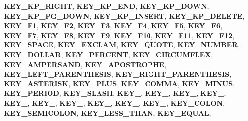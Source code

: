 \begin{DoxyCompactItemize}
{\bfseries K\+E\+Y\+\_\+\+K\+P\+\_\+\+R\+I\+G\+HT}, 
\newline
{\bfseries K\+E\+Y\+\_\+\+K\+P\+\_\+\+E\+ND}, 
{\bfseries K\+E\+Y\+\_\+\+K\+P\+\_\+\+D\+O\+WN}, 
{\bfseries K\+E\+Y\+\_\+\+K\+P\+\_\+\+P\+G\+\_\+\+D\+O\+WN}, 
{\bfseries K\+E\+Y\+\_\+\+K\+P\+\_\+\+I\+N\+S\+E\+RT}, 
\newline
{\bfseries K\+E\+Y\+\_\+\+K\+P\+\_\+\+D\+E\+L\+E\+TE}, 
{\bfseries K\+E\+Y\+\_\+\+F1}, 
{\bfseries K\+E\+Y\+\_\+\+F2}, 
{\bfseries K\+E\+Y\+\_\+\+F3}, 
\newline
{\bfseries K\+E\+Y\+\_\+\+F4}, 
{\bfseries K\+E\+Y\+\_\+\+F5}, 
{\bfseries K\+E\+Y\+\_\+\+F6}, 
{\bfseries K\+E\+Y\+\_\+\+F7}, 
\newline
{\bfseries K\+E\+Y\+\_\+\+F8}, 
{\bfseries K\+E\+Y\+\_\+\+F9}, 
{\bfseries K\+E\+Y\+\_\+\+F10}, 
{\bfseries K\+E\+Y\+\_\+\+F11}, 
\newline
{\bfseries K\+E\+Y\+\_\+\+F12}, 
{\bfseries K\+E\+Y\+\_\+\+S\+P\+A\+CE}, 
{\bfseries K\+E\+Y\+\_\+\+E\+X\+C\+L\+AM}, 
{\bfseries K\+E\+Y\+\_\+\+Q\+U\+O\+TE}, 
\newline
{\bfseries K\+E\+Y\+\_\+\+N\+U\+M\+B\+ER}, 
{\bfseries K\+E\+Y\+\_\+\+D\+O\+L\+L\+AR}, 
{\bfseries K\+E\+Y\+\_\+\+P\+E\+R\+C\+E\+NT}, 
{\bfseries K\+E\+Y\+\_\+\+C\+I\+R\+C\+U\+M\+F\+L\+EX}, 
\newline
{\bfseries K\+E\+Y\+\_\+\+A\+M\+P\+E\+R\+S\+A\+ND}, 
{\bfseries K\+E\+Y\+\_\+\+A\+P\+O\+S\+T\+R\+O\+P\+HE}, 
{\bfseries K\+E\+Y\+\_\+\+L\+E\+F\+T\+\_\+\+P\+A\+R\+E\+N\+T\+H\+E\+S\+IS}, 
{\bfseries K\+E\+Y\+\_\+\+R\+I\+G\+H\+T\+\_\+\+P\+A\+R\+E\+N\+T\+H\+E\+S\+IS}, 
\newline
{\bfseries K\+E\+Y\+\_\+\+A\+S\+T\+E\+R\+I\+SK}, 
{\bfseries K\+E\+Y\+\_\+\+P\+L\+US}, 
{\bfseries K\+E\+Y\+\_\+\+C\+O\+M\+MA}, 
{\bfseries K\+E\+Y\+\_\+\+M\+I\+N\+US}, 
\newline
{\bfseries K\+E\+Y\+\_\+\+P\+E\+R\+I\+OD}, 
{\bfseries K\+E\+Y\+\_\+\+S\+L\+A\+SH}, 
{\bfseries K\+E\+Y\+\_}, 
{\bfseries K\+E\+Y\+\_}, 
\newline
{\bfseries K\+E\+Y\+\_}, 
{\bfseries K\+E\+Y\+\_}, 
{\bfseries K\+E\+Y\+\_}, 
{\bfseries K\+E\+Y\+\_}, 
\newline
{\bfseries K\+E\+Y\+\_}, 
{\bfseries K\+E\+Y\+\_}, 
{\bfseries K\+E\+Y\+\_}, 
{\bfseries K\+E\+Y\+\_}, 
\newline
{\bfseries K\+E\+Y\+\_\+\+C\+O\+L\+ON}, 
{\bfseries K\+E\+Y\+\_\+\+S\+E\+M\+I\+C\+O\+L\+ON}, 
{\bfseries K\+E\+Y\+\_\+\+L\+E\+S\+S\+\_\+\+T\+H\+AN}, 
{\bfseries K\+E\+Y\+\_\+\+E\+Q\+U\+AL}, 

\end{DoxyCompactItemize}
